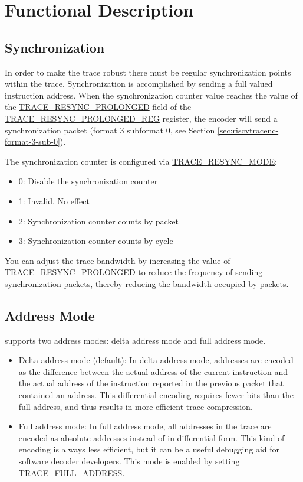\documentclass[main\_\_EN.tex]{subfiles}
\begin{document}

\section{Functional Description}
\label{sec:riscvtracenc-func-desc}

\subsection{Synchronization}

In order to make the trace robust there must be regular synchronization points within the trace. Synchronization is accomplished by sending a full valued instruction address. When the synchronization counter value reaches the value of the \hyperref[fielddesc:TRACERESYNCPROLONGED]{TRACE\_RESYNC\_PROLONGED} field of the \hyperref[regdesc:TRACERESYNCPROLONGEDREG]{TRACE\_RESYNC\_PROLONGED\_REG} register, the encoder will send a synchronization packet (format 3 subformat 0, see Section \ref{sec:riscvtracenc-format-3-sub-0}).

The synchronization counter is configured via \hyperref[fielddesc:TRACERESYNCMODE]{TRACE\_RESYNC\_MODE}:
\begin{itemize}
    \item 0: Disable the synchronization counter
    \item 1: Invalid. No effect
    \item 2: Synchronization counter counts by packet
    \item 3: Synchronization counter counts by cycle
\end{itemize}

You can adjust the trace bandwidth by increasing the value of \hyperref[fielddesc:TRACERESYNCPROLONGED]{TRACE\_RESYNC\_PROLONGED} to reduce the frequency of sending synchronization packets, thereby reducing the bandwidth occupied by packets.

\subsection{Address Mode}

\chipname{} supports two address modes: delta address mode and full address mode.
\begin{itemize}
    \item Delta address mode (default): In delta address mode, addresses are encoded as the difference between the actual address of the current instruction and the actual address of the instruction reported in the previous packet that contained an address. This differential encoding requires fewer bits than the full address, and thus results in more efficient trace compression.
    \item Full address mode: In full address mode, all addresses in the trace are encoded as absolute addresses instead of in differential form. This kind of encoding is always less efficient, but it can be a useful debugging aid for software decoder developers. This mode is enabled by setting \hyperref[fielddesc:TRACEFULLADDRESS]{TRACE\_FULL\_ADDRESS}.
\end{itemize}
\end{document}
